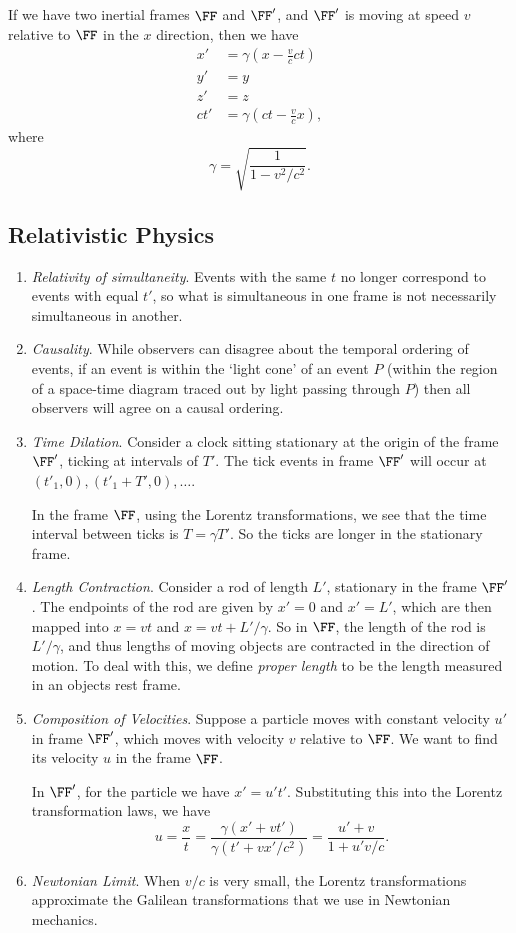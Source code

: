 \documentclass[a4paper]{scrartcl}
\begin{document}
If we have two inertial frames $\FF$ and $\FF'$, and $\FF'$ is moving at speed $v$ relative to $\FF$ in the $x$ direction, then we have
\begin{align*}
	x' &= \gamma \left(x - \frac{v}{c} ct\right) \\
	y' &= y \\
	z' &= z \\
	ct' &= \gamma\left(ct - \frac{v}{c}x\right),
\end{align*}  
where
$$
\gamma = \sqrt{\frac{1}{1 - v^2/c^2}}.
$$


\subsection{Relativistic Physics}

\begin{enumerate}
	\item \emph{Relativity of simultaneity}. Events with the same $t$ no longer correspond to events with equal $t'$, so what is simultaneous in one frame is not necessarily simultaneous in another.
	\item \emph{Causality}. While observers can disagree about the temporal ordering of events, if an event is within the `light cone' of an event $P$ (within the region of a space-time diagram traced out by light passing through $P$) then all observers will agree on a causal ordering.  
	\item \emph{Time Dilation}. Consider a clock sitting stationary at the origin of the frame $\FF'$, ticking at intervals of $T'$. The tick events in frame $\FF'$ will occur at $(t'_1, 0), (t'_1 + T', 0), \dots$. 
	
	In the frame $\FF$, using the Lorentz transformations, we see that the time interval between ticks is $T = \gamma T'$. So the ticks are longer in the stationary frame. 
	\item \emph{Length Contraction}. Consider a rod of length $L'$, stationary in the frame $\FF'$. 
	The endpoints of the rod are given by $x' = 0$ and $x' = L'$, which are then mapped into $x = vt$ and $x = vt + L'/\gamma$. 
	So in $\FF$, the length of the rod is $L'/\gamma$, and thus lengths of moving objects are contracted in the direction of motion. To deal with this, we define \emph{proper length} to be the length measured in an objects rest frame.
	\item \emph{Composition of Velocities}. Suppose a particle moves with constant velocity $u'$ in frame $\FF'$, which moves with velocity $v$ relative to $\FF$. We want to find its velocity $u$ in the frame $\FF$.

	In $\FF'$, for the particle we have $x' = u't'$. Substituting this into the Lorentz transformation laws, we have
	$$
	u = \frac{x}{t} = \frac{\gamma(x' + vt')}{\gamma(t' + vx'/c^2)} = \frac{u' + v}{1 + u' v/c}.
	$$
	\item \emph{Newtonian Limit}. When $v/c$ is very small, the Lorentz transformations approximate the Galilean transformations that we use in Newtonian mechanics.
\end{enumerate}
\end{document}
